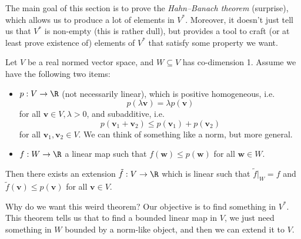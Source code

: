 \documentclass[a4paper]{article}
\begin{document}
The main goal of this section is to prove the \emph{Hahn--Banach theorem} (surprise), which allows us to produce a lot of elements in $V^*$. Moreover, it doesn't just tell us that $V^*$ is non-empty (this is rather dull), but provides a tool to craft (or at least prove existence of) elements of $V^*$ that satisfy some property we want.

\begin{prop}
  Let $V$ be a real normed vector space, and $W\subseteq V$ has co-dimension 1. Assume we have the following two items:
  \begin{itemize}
    \item $p: V \to \R$ (not necessarily linear), which is positive homogeneous, i.e.
      \[
        p (\lambda \mathbf{v}) = \lambda p(\mathbf{v})
      \]
      for all $\mathbf{v}\in V, \lambda > 0$, and subadditive, i.e.
      \[
        p(\mathbf{v}_1 + \mathbf{v}_2) \leq p (\mathbf{v}_1) + p(\mathbf{v}_2)
      \]
      for all $\mathbf{v}_1, \mathbf{v}_2 \in V$. We can think of something like a norm, but more general.
    \item $f: W \to \R$ a linear map such that $f(\mathbf{w}) \leq p (\mathbf{w})$ for all $\mathbf{w}\in W$.
  \end{itemize}
  Then there exists an extension $\tilde{f}: V\to \R$ which is linear such that $\tilde{f}|_{W} = f$ and $\tilde{f}(\mathbf{v}) \leq p(\mathbf{v})$ for all $\mathbf{v}\in V$.
\end{prop}
Why do we want this weird theorem? Our objective is to find something in $V^*$. This theorem tells us that to find a bounded linear map in $V$, we just need something in $W$ bounded by a norm-like object, and then we can extend it to $V$.
\end{document}
